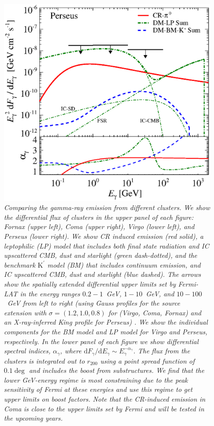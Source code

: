 \documentclass[10pt,aps,pra,reprint,amsmath,amsfonts,amssymb,showpacs,nofootinbib,floatfix]{revtex4-1}
\newcommand{\Fermi}{{\em Fermi}\xspace}
\newcommand{\rmn}{\mathrm}
\newcommand{\Kp}{\rmn{K}^\prime}
\newcommand{\dd}{\rmn{d}}
\newcommand{\rvir}{r_{200}}
\begin{document}
\begin{figure}
\begin{minipage}{2.0\columnwidth}
\includegraphics[width=0.49\columnwidth]{figures/flux.cluster.Perseus.v14.0.1deg.1.6T.SubMass.SF700.IR2.noMW.woGal.eps}
\caption{\it Comparing the gamma-ray emission from different
  clusters. We show the differential flux of clusters in the upper
  panel of each figure: Fornax (upper left), Coma (upper right), Virgo
  (lower left), and Perseus (lower right). We show CR induced emission
  (red solid), a leptophilic (LP) model that includes both final state
  radiation and IC upscattered CMB, dust and starlight (green
  dash-dotted), and the benchmark $\Kp$ model (BM) that includes
  continuum emission, and IC upscattered CMB, dust and starlight (blue
  dashed). The arrows show the spatially extended differential upper
  limits set by \Fermi-LAT in the energy ranges $0.2-1$~GeV,
  $1-10$~GeV, and $10-100$~GeV from left to right (using Gauss
  profiles for the source extension with $\sigma=(1.2,1.0,0.8)$ for
  (Virgo, Coma, Fornax) and an X-ray-inferred King profile for
  Perseus) \cite{2010ApJ...717L..71A}. We show the individual
  components for the BM model and LP model for Virgo and Perseus,
  respectively. In the lower panel of each figure we show differential
  spectral indices, $\alpha_\gamma$, where $\dd F_\gamma/\dd E_\gamma
  \sim E_\gamma^{-\alpha_\gamma}$. The flux from the clusters is
  integrated out to $\rvir$ using a point spread function of $0.1\deg$
  and includes the boost from substructures. We find that the lower
  GeV-energy regime is most constraining due to the peak sensitivity
  of \Fermi at these energies and use this regime to get upper limits
  on boost factors. Note that the CR-induced emission in Coma is close
  to the upper limits set by \Fermi and will be tested in the upcoming
  years.}
 \label{fig:clu_comp}
\end{minipage}
\end{figure}
\end{document}
